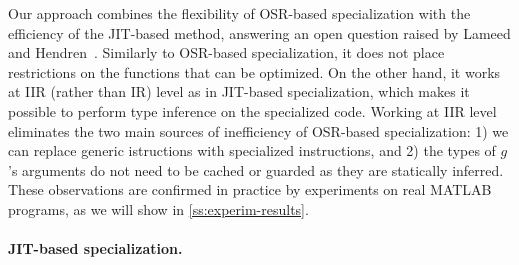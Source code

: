 

Our approach combines the flexibility of OSR-based specialization with the efficiency of the JIT-based method, answering an open question raised by Lameed and Hendren~\cite{lameed2013feval}. Similarly to OSR-based specialization, it does not place restrictions on the functions that can be optimized. On the other hand, it works at IIR (rather than IR) level as in JIT-based specialization, which makes it possible to perform type inference on the specialized code. Working at IIR level eliminates the two main sources of inefficiency of OSR-based specialization: 1) we can replace generic istructions with specialized instructions, and 2) the types of $g$'s arguments do not need to be cached or guarded as they are statically inferred. These observations are confirmed in practice by experiments on real MATLAB programs, as we will show in \mysection\ref{ss:experim-results}.





\ifdefined\fullver
\paragraph{JIT-based specialization.}  

